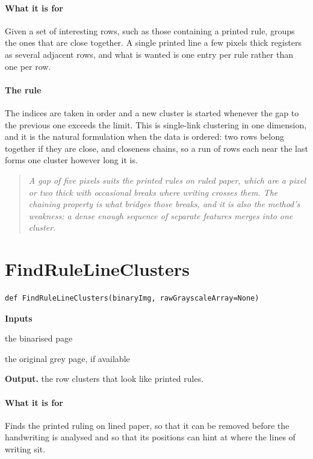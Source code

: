 \paragraph{What it is for}
Given a set of interesting rows, such as those containing a printed rule, groups the ones that are close together. A single printed line a few pixels thick registers as several adjacent rows, and what is wanted is one entry per rule rather than one per row.


\paragraph{The rule}
The indices are taken in order and a new cluster is started whenever the gap to the previous one exceeds the limit. This is single-link clustering in one dimension, and it is the natural formulation when the data is ordered: two rows belong together if they are close, and closeness chains, so a run of rows each near the last forms one cluster however long it is.


\begin{quote}\small\itshape A gap of five pixels suits the printed rules on ruled paper, which are a pixel or two thick with occasional breaks where writing crosses them. The chaining property is what bridges those breaks, and it is also the method's weakness: a dense enough sequence of separate features merges into one cluster.\end{quote}

\section{FindRuleLineClusters}
\begin{lstlisting}[style=sig]
def FindRuleLineClusters(binaryImg, rawGrayscaleArray=None)
\end{lstlisting}

\noindent\textbf{Inputs}
\begin{description}[leftmargin=2.2em,style=nextline,font=\normalfont\ttfamily]\setlength\itemsep{1pt}
  \item[{binaryImg}] \normalfont the binarised page
  \item[{rawGrayscaleArray}] \normalfont the original grey page, if available
\end{description}

\noindent\textbf{Output.} the row clusters that look like printed rules.


\paragraph{What it is for}
Finds the printed ruling on lined paper, so that it can be removed before the handwriting is analysed and so that its positions can hint at where the lines of writing sit.


